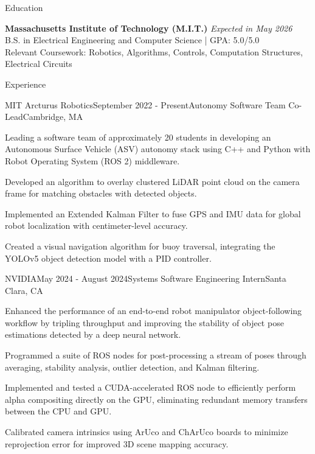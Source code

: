 \documentclass[
	11pt,
]{resume}
\begin{document}
\begin{rSection}{Education}

	\textbf{Massachusetts Institute of Technology (M.I.T.)} \hfill \textit{Expected in May 2026} \\ 
	B.S. in Electrical Engineering and Computer Science | GPA: 5.0/5.0 \\
    Relevant Coursework: Robotics, Algorithms, Controls, Computation Structures, Electrical Circuits
\end{rSection}

\begin{rSection}{Experience}

	\begin{rSubsection}{MIT Arcturus Robotics}{September 2022 - Present}{Autonomy Software Team Co-Lead}{Cambridge, MA}
    \item Leading a software team of approximately 20 students in developing an Autonomous Surface Vehicle (ASV) autonomy stack using C++ and Python with Robot Operating System (ROS 2) middleware.
    \item Developed an algorithm to overlay clustered LiDAR point cloud on the camera frame for matching obstacles with detected objects.
    \item Implemented an Extended Kalman Filter to fuse GPS and IMU data for global robot localization with centimeter-level accuracy.
    \item Created a visual navigation algorithm for buoy traversal, integrating the YOLOv5 object detection model with a PID controller.
    \end{rSubsection}

	\begin{rSubsection}{NVIDIA}{May 2024 - August 2024}{Systems Software Engineering Intern}{Santa Clara, CA}
    \item Enhanced the performance of an end-to-end robot manipulator object-following workflow by tripling throughput and improving the stability of object pose estimations detected by a deep neural network.
    \item Programmed a suite of ROS nodes for post-processing a stream of poses through averaging, stability analysis, outlier detection, and Kalman filtering.
    \item Implemented and tested a CUDA-accelerated ROS node to efficiently perform alpha compositing directly on the GPU, eliminating redundant memory transfers between the CPU and GPU.
    \item Calibrated camera intrinsics using ArUco and ChArUco boards to minimize reprojection error for improved 3D scene mapping accuracy.
    \end{rSubsection}


\end{rSection}
\end{document}

